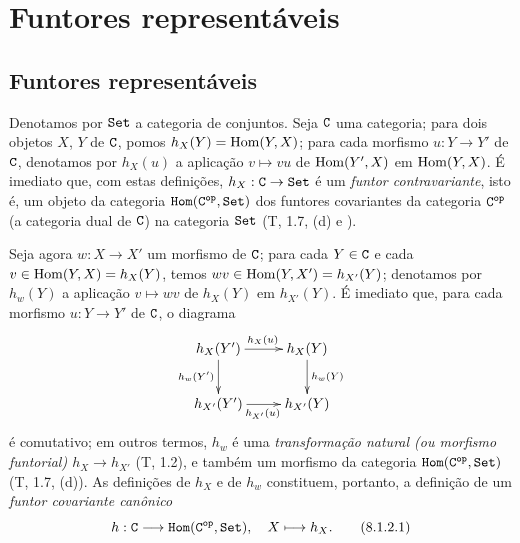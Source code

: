 \section{Funtores representáveis}
\label{section:0.8}

\subsection{Funtores representáveis}
\label{subsection:0.8.1}

\begin{env}[8.1.1]
\label{0.8.1.1}
Denotamos por $\mathtt{Set}$ a categoria de conjuntos.
Seja $\mathtt{C}$ uma categoria; para dois objetos $X$, $Y$ de $\mathtt{C}$, pomos $h_X(Y)=\operatorname{Hom}(Y,X)$; para cada morfismo $u:Y\to Y'$ de $\mathtt{C}$, denotamos por $h_X(u)$ a aplicação $v\mapsto vu$ de $\operatorname{Hom}(Y',X)$ em $\operatorname{Hom}(Y,X)$.
É imediato que, com estas definições, $h_X:\C\to\Set$ é um \emph{funtor contravariante}, isto é, um objeto da categoria $\mathtt{Hom}(\mathtt{C}^\mathtt{op},\mathtt{Set})$ dos funtores covariantes da categoria $\mathtt{C}^\mathtt{op}$ (a categoria dual de $\mathtt{C}$) na categoria $\mathtt{Set}$ (T, 1.7, (d) e \cite{III-29}).
\end{env}

\begin{env}[8.1.2]
\label{0.8.1.2}
Seja agora $w:X\to X'$ um morfismo de $\mathtt{C}$; para cada $Y\in\mathtt{C}$ e cada $v\in\operatorname{Hom}(Y,X)=h_X(Y)$,
temos $wv\in\operatorname{Hom}(Y,X')=h_{X'}(Y)$; denotamos por $h_w(Y)$ a aplicação $v\mapsto wv$ de
$h_X(Y)$ em $h_{X'}(Y)$. É imediato que, para cada morfismo $u:Y\to Y'$ de $\mathtt{C}$, o
diagrama
\[
  \xymatrix{
    h_X(Y')\ar[r]^{h_X(u)}\ar[d]_{h_w(Y')} &
    h_X(Y)\ar[d]^{h_w(Y)}\\
    h_{X'}(Y')\ar[r]_{h_{X'}(u)} &
    h_{X'}(Y)
  }
\]
é comutativo; em outros termos, $h_w$ é uma \emph{transformação natural (ou morfismo funtorial)
$h_X\to h_{X'}$} (T, 1.2), e também um morfismo da categoria $\mathtt{Hom}(\mathtt{C}^\mathtt{op},\mathtt{Set})$ (T, 1.7, (d)). As
definições de $h_X$ e de $h_w$ constituem, portanto, a definição de um \emph{funtor covariante
canônico}
\[
  h:\C\to\CHom(\C\op,\Set),\quad X\mapsto h_X.
  \tag{8.1.2.1}
\]
\end{env}

